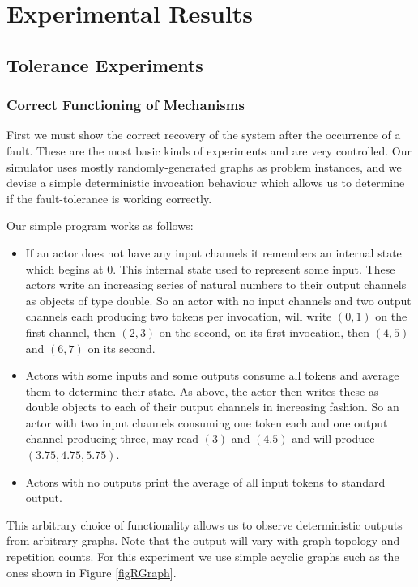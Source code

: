 \chapter{Experimental Results}
\label{chapExperiment}

\section{Tolerance Experiments}

\subsection{Correct Functioning of Mechanisms}

First we must show the correct recovery of the system after the occurrence of a fault.
These are the most basic kinds of experiments and are very controlled.
Our simulator uses mostly randomly-generated graphs as problem instances, and we devise a simple deterministic invocation behaviour which allows us to determine if the fault-tolerance is working correctly.

Our simple program works as follows:
\begin{itemize}
	\item If an actor does not have any input channels it remembers an internal state which begins at 0.
			This internal state used to represent some input.
			These actors write an increasing series of natural numbers to their output channels as objects of type double.
			So an actor with no input channels and two output channels each producing two tokens per invocation, will write $(0,1)$ on the first channel, then $(2,3)$ on the second, on its first invocation, then $(4, 5)$ and $(6, 7)$ on its second.
	\item Actors with some inputs and some outputs consume all tokens and average them to determine their state.
			As above, the actor then writes these as double objects to each of their output channels in increasing fashion.
			So an actor with two input channels consuming one token each and one output channel producing three, may read $(3)$ and $(4.5)$ and will produce $(3.75, 4.75, 5.75)$.
	\item Actors with no outputs print the average of all input tokens to standard output.
\end{itemize}
\noindent This arbitrary choice of functionality allows us to observe deterministic outputs from arbitrary graphs.
Note that the output will vary with graph topology and repetition counts.
For this experiment we use simple acyclic graphs such as the ones shown in Figure \ref{figRGraph}.

